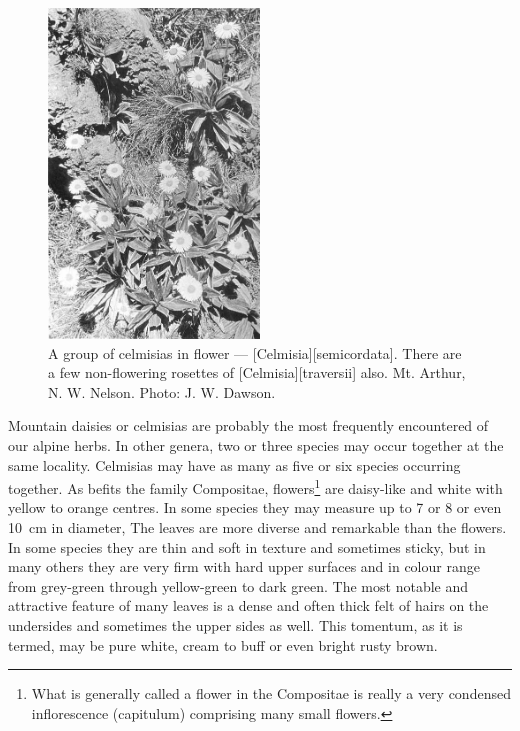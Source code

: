\begin{figure}
	\includegraphics[width=0.5\textwidth]{graphics/figure102celmisias.jpg}
	\centering
	\caption[A group of celmisias in flower]{A group of celmisias in flower --- [Celmisia][semicordata].
	There are a few non-flowering rosettes of [Celmisia][traversii] also.
	Mt. Arthur,  N. W. Nelson.
	Photo: J. W. Dawson.}%
	\label{fig:102celmisias}
\end{figure}

Mountain daisies or celmisias are probably the most frequently encountered of our alpine herbs.
In other genera, two or three species may occur together at the same locality.
Celmisias may have as many as five or six species occurring together.
As befits the family Compositae,  flowers\footnote{What is generally called a flower in the Compositae is really a very condensed inflorescence (capitulum) comprising many small flowers.} are daisy-like and white with yellow to orange centres.
In some species they may measure up to 7 or 8 or even \SI{10}{\centi\metre} in diameter, The leaves are more diverse and remarkable than the flowers.
In some species they are thin and soft in texture and sometimes sticky, but in many others they are very firm with hard upper surfaces and in colour range from grey-green through yellow-green to dark green.
The most notable and attractive feature of many  leaves is a dense and often thick felt of hairs on the undersides and sometimes the upper sides as well.
This tomentum, as it is termed, may be pure white, cream to buff or even bright rusty brown.

